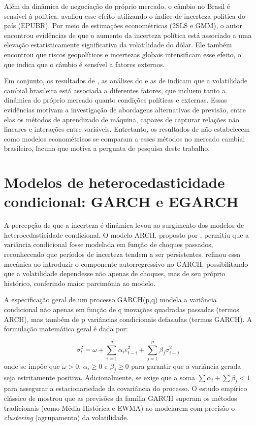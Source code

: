 Além da dinâmica de negociação do próprio mercado, o câmbio no Brasil é sensível à política. \textcite{moreira2022impactos} avaliou esse efeito utilizando o índice de incerteza política do país (EPUBR). Por meio de estimações econométricas (2SLS e GMM), o autor encontrou evidências de que o aumento da incerteza política está associado a uma elevação estatisticamente significativa da volatilidade do dólar. Ele também encontrou que riscos geopolíticos e incertezas globais intensificam esse efeito, o que indica que o câmbio é sensível a fatores externos. 

Em conjunto, os resultados de \textcite{campani2018forecasting}, as análises do \textcite{bacen2021volatilidade} e as de \textcite{moreira2022impactos} indicam que a volatilidade cambial brasileira está associada a diferentes fatores, que incluem tanto a dinâmica do próprio mercado quanto condições políticas e externas. Essas evidências motivam a investigação de abordagens alternativas de previsão, entre elas os métodos de aprendizado de máquina, capazes de capturar relações não lineares e interações entre variáveis. Entretanto, os resultados de \textcite{campani2018forecasting} não estabelecem como modelos econométricos se comparam a esses métodos no mercado cambial brasileiro, lacuna que motiva a pergunta de pesquisa deste trabalho.

\section{Modelos de heterocedasticidade condicional: GARCH e EGARCH}

    A percepção de que a incerteza é dinâmica levou ao surgimento dos modelos de heterocedasticidade condicional. O modelo ARCH, proposto por \textcite{engle1982autoregressive}, permitiu que a variância condicional fosse modelada em função de choques passados,
 reconhecendo que períodos de incerteza tendem a ser persistentes. \textcite{bollerslev1986generalized} refinou essa mecânica ao introduzir o componente autorregressivo no GARCH, possibilitando que a volatilidade dependesse não apenas de choques, mas de 
 seu próprio histórico, conferindo maior parcimônia ao modelo.

 A especificação geral de um processo GARCH(p,q) modela a variância condicional não apenas em função de q inovações quadradas passadas (termos ARCH), mas também de p variâncias condicionais defasadas (termos GARCH). A formulação matemática geral é dada por:

\begin{equation}
    \sigma_t^2 = \omega + \sum_{i=1}^{q} \alpha_i \varepsilon_{t-i}^2 + \sum_{j=1}^{p} \beta_j \sigma_{t-j}^2
\end{equation}
onde se impõe que $\omega > 0$, $\alpha_i \geq 0$ e $\beta_j \geq 0$ para garantir que a variância gerada seja estritamente positiva. Adicionalmente, se exige que a soma $\sum \alpha_i + \sum \beta_j < 1$ para assegurar a estacionariedade da 
covariância do processo. O estudo empírico clássico de \textcite{akgiray1989conditional}mostrou que as previsões da família GARCH superam os métodos tradicionais (como Média Histórica e EWMA) ao modelarem com precisão o \textit{clustering} (agrupamento) da volatilidade.

